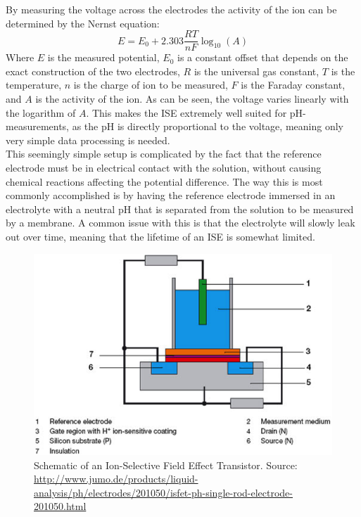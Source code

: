 \noindent
By measuring the voltage across the electrodes the activity of the ion can be determined by the Nernst equation\cite{website:ph1}:
\begin{equation}\label{key}
E = E_0 + 2.303 \frac{R T}{n F} \log_{10}{(A)}
\end{equation}
Where $E$ is the measured potential, $E_0$ is a constant offset that depends on the exact construction of the two electrodes, $R$ is the universal gas constant, $T$ is the temperature, $n$ is the charge of ion to be measured, $F$ is the Faraday constant, and $A$ is the activity of the ion\cite{website:ph1}. As can be seen, the voltage varies linearly with the logarithm of $A$. This makes the ISE extremely well suited for pH-measurements, as the pH is directly proportional to the voltage, meaning only very simple data processing is needed.\\


\noindent
This seemingly simple setup is complicated by the fact that the reference electrode must be in electrical contact with the solution, without causing chemical reactions affecting the potential difference. The way this is most commonly accomplished is by having the reference electrode immersed in an electrolyte with a neutral pH that is separated from the solution to be measured by a membrane\cite{website:ph2}. A common issue with this is that the electrolyte will slowly leak out over time, meaning that the lifetime of an ISE is somewhat limited. \\

\begin{figure}[htb]
	\centering
	\includegraphics[width=.7\textwidth]{figures/ISFET.png}
	\caption{Schematic of an Ion-Selective Field Effect Transistor. Source: \url{http://www.jumo.de/products/liquid-analysis/ph/electrodes/201050/isfet-ph-single-rod-electrode-201050.html}}
	\label{fig:ISFET}
\end{figure}

